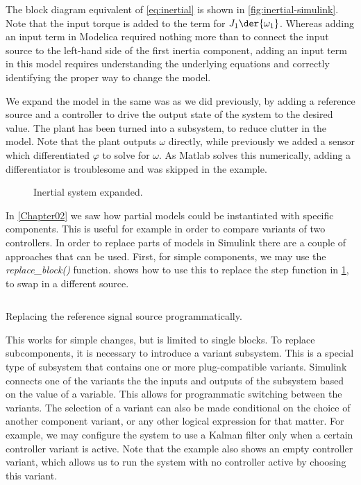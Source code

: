 \documentclass[\rootfolder/main.tex]{subfiles}
\begin{document}
The block diagram equivalent of \cref{eq:inertial} is shown in \cref{fig:inertial-simulink}.
Note that the input torque is added to the term for $J_{1} \der{\omega_{1}}$.
Whereas adding an input term in Modelica required nothing more than to connect the input source to the left-hand side of the first inertia component,
adding an input term in this model requires understanding the underlying equations and correctly identifying the proper way to change the model.

We expand the model in the same was as we did previously, by adding a reference source and a controller to drive the output state of the system to the desired value.
The plant has been turned into a subsystem, to reduce clutter in the model.
Note that the plant outputs $\omega$ directly, while previously we added a sensor which differentiated $\varphi$ to solve for $\omega$.
As Matlab solves this numerically, adding a differentiator is troublesome and was skipped in the example.

\begin{figure}[ht]
    \centering
    \footnotesize
    
    \caption{Inertial system expanded.\label{fig:inertial-simulink-expanded}}
\end{figure}

In \cref{Chapter02} we saw how partial models could be instantiated with specific components.
This is useful for example in order to compare variants of two controllers.
In order to replace parts of models in Simulink there are a couple of approaches that can be used.
First, for simple components, we may use the \emph{replace\_block()} function.
 shows how to use this to replace the step function in \cref{fig:inertial-simulink-expanded}, to swap in a different source.

\begin{listing}[ht]
    \inputminted[fontsize=\footnotesize, firstline=1, lastline=4]{matlab}{\rootfolder/Models/Matlab/ReplaceSource.m}
    \caption{Replacing the reference signal source programmatically.\label{lst:matlab-replace}}
\end{listing}

This works for simple changes, but is limited to single blocks.
To replace subcomponents, it is necessary to introduce a variant subsystem.
This is a special type of subsystem that contains one or more plug-compatible variants.
Simulink connects one of the variants the the inputs and outputs of the subsystem based on the value of a variable.
This allows for programmatic switching between the variants.
The selection of a variant can also be made conditional on the choice of another component variant, or any other logical expression for that matter.
For example, we may configure the system to use a Kalman filter only when a certain controller variant is active.
Note that the example also shows an empty controller variant, which allows us to run the system with no controller active by choosing this variant.
\end{document}
